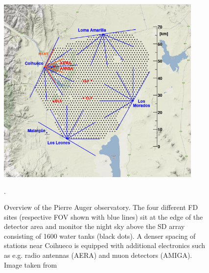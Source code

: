\begin{figure}
	\centering
	\includegraphics[width=0.9\textwidth]{imgs/auger_array.png}
	\caption{Overview of the Pierre Auger observatory. The four different FD sites (respective FOV shown with blue lines) sit at the edge of the detector area and 
	monitor the night sky above the SD array consisting of 1600 water tanks (black dots). A denser spacing of stations near Coihueco is equipped with additional 
	electronics such as e.g. radio antennas (AERA) and muon detectors (AMIGA). Image taken from \cite{AugerArray}}. \label{fig:auger-array}
\end{figure}

